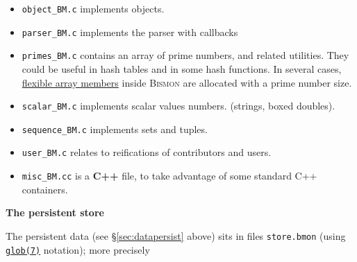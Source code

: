 \begin{appendices}
\begin{itemize}
  \item \texttt{object\_BM.c} implements
    objects. 
     

  \item \texttt{parser\_BM.c} implements the parser
     with callbacks

  \item \texttt{primes\_BM.c} contains an array of prime numbers,
     and related
    utilities. They could be useful in hash tables 
    and in some hash functions. In several cases,
    \href{https://en.wikipedia.org/wiki/Flexible_array_member}{flexible
      array members} inside \textsc{Bismon} are allocated with a prime
    number size.  

  \item \texttt{scalar\_BM.c} implements scalar values
      
    numbers.  (strings,
    boxed doubles).

  \item \texttt{sequence\_BM.c} implements sets and
    tuples.

  \item \texttt{user\_BM.c} relates
     to reifications of
    contributors and  users.

  \item \texttt{misc\_BM.cc} is a \textbf{C++} file,
     to take advantage of
    some standard C++   containers.
\end{itemize}

{\large \textbf{The persistent store}}

The persistent data (see \S \ref{sec:datapersist} above) sits in files
 
 \texttt{store\textsection*.bmon}
(using
\href{https://man7.org/linux/man-pages/man7/glob.7.html}{\texttt{glob(7)}}
notation); more precisely

\begin{itemize}


\end{itemize}
\end{appendices}
